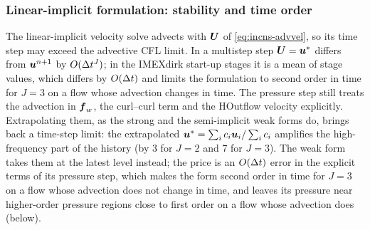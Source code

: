 \subsubsection{Linear-implicit formulation: stability and time order}
\label{sec:incns-weak-li}

The linear-implicit velocity solve advects with $\boldsymbol{U}$ of
\eqref{eq:incns-advvel}, so its time step may exceed the advective CFL
limit. In a multistep step $\boldsymbol{U}=\boldsymbol{u}^*$ differs from
$\boldsymbol{u}^{n+1}$ by $O(\Delta t^J)$; in the IMEXdirk start-up stages it is
a mean of stage values, which differs by $O(\Delta t)$ and limits the
formulation to second order in time for $J=3$ on a flow whose advection
changes in time. The pressure step still treats the advection in
$\boldsymbol{f}_w$, the curl--curl term and the HOutflow velocity explicitly.
Extrapolating them, as the strong and the semi-implicit weak forms do,
brings back a time-step limit: the extrapolated
$\boldsymbol{u}^*=\sum_ic_i\boldsymbol{u}_i/\sum_ic_i$ amplifies the high-frequency
part of the history (by 3 for $J=2$ and 7 for $J=3$). The weak form takes
them at the latest level instead; the price is an $O(\Delta t)$ error in
the explicit terms of its pressure step, which makes the form second order
in time for $J=3$ on a flow whose advection does not change in time, and
leaves its pressure near higher-order pressure regions close to first order
on a flow whose advection does (below).


